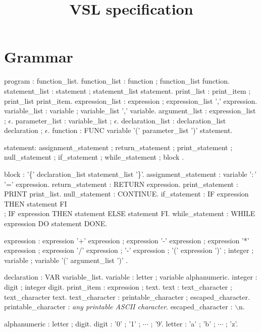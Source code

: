 \documentclass[a4paper,10pt]{article}
\title{VSL specification}
\author{}
\date{}
\begin{document}
\maketitle

\section{Grammar}
\begin{grammar}
program : function\_list.
function\_list : function ; function\_list function.
statement\_list : statement ; statement\_list statement.
print\_list : print\_item ; print\_list print\_item.
expression\_list : expression ; expression\_list ',' expression.
variable\_list : variable ; variable\_list ',' variable.
argument\_list : expression\_list ; $\epsilon$.
parameter\_list : variable\_list ; $\epsilon$.
declaration\_list : declaration\_list declaration ; $\epsilon$.
function : FUNC variable '(' parameter\_list ')' statement.

statement:
      assignment\_statement
    ; return\_statement
    ; print\_statement
    ; null\_statement
    ; if\_statement
    ; while\_statement
    ; block
    .

block : '\{' declaration\_list statement\_list '\}'.
assignment\_statement : variable '$\colon$' '=' expression.
return\_statement : RETURN expression.
print\_statement : PRINT print\_list.
null\_statement : CONTINUE.
if\_statement : IF expression THEN statement FI \\;
      IF expression THEN statement ELSE statement FI.
while\_statement : WHILE expression DO statement DONE.

expression :
      expression '+' expression
    ; expression '-' expression
    ; expression '*' expression
    ; expression '/' expression
    ; '-' expression
    ; '(' expression ')'
    ; integer ; variable ; variable '(' argument\_list ')'
    .

declaration : VAR variable\_list.
variable : letter ; variable alphanumeric.
integer : digit ; integer digit.
print\_item : expression ; text.
text : text\_character ; text\_character text.
text\_character : printable\_character ; escaped\_character.
printable\_character : {\it any printable ASCII character}.
escaped\_character : $\backslash$n.

alphanumeric : letter ; digit.
digit : '0' ; '1' ; $\cdots$ ; '9'.
letter : 'a' ; 'b' ; $\cdots$ ; 'z'.
\end{grammar}
\end{document}
